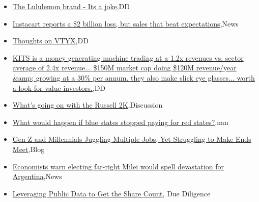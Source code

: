 \documentclass{article}%
\begin{document}
%
\begin{itemize}%
\item%
\href{https://reddit.com/r/wallstreetbets/comments/17rbt3i/the\_lululemon\_brand\_its\_a\_joke/}{The Lululemon brand - Its a joke},DD%
\item%
\href{https://reddit.com/r/wallstreetbets/comments/17r6kcf/instacart\_reports\_a\_2\_billion\_loss\_but\_sales\_that/}{Instacart reports a \$2 billion loss, but sales that beat expectations},News%
\item%
\href{https://reddit.com/r/wallstreetbets/comments/17r6050/thoughts\_on\_vtyx/}{Thoughts on VTYX},DD%
\item%
\href{https://reddit.com/r/Baystreetbets/comments/17qrhf1/kits\_is\_a\_money\_generating\_machine\_trading\_at\_a/}{KITS is a money generating machine trading at a 1.2x revenues vs. sector average of 2.4x revenue... \$150M market cap doing \$120M revenue/year \&amp; growing at a 30\% per annum. they also make slick eye glasses... worth a look for value-investors.},DD%
\item%
\href{https://reddit.com/r/StockMarket/comments/17quhs3/whats\_going\_on\_with\_the\_russell\_2k/}{What's going on with the Russell 2K},Discussion%
\item%
\href{https://reddit.com/r/Economics/comments/17r9qbp/what\_would\_happen\_if\_blue\_states\_stopped\_paying/}{What would happen if blue states stopped paying for red states?},nan%
\item%
\href{https://reddit.com/r/Economics/comments/17r5vdd/gen\_z\_and\_millennials\_juggling\_multiple\_jobs\_yet/}{Gen Z and Millennials Juggling Multiple Jobs, Yet Struggling to Make Ends Meet},Blog%
\item%
\href{https://reddit.com/r/Economics/comments/17qyvmh/economists\_warn\_electing\_farright\_milei\_would/}{Economists warn electing far-right Milei would spell devastation for Argentina},News%
\item%
\href{https://reddit.com/r/Superstonk/comments/17r1i1p/leveraging\_public\_data\_to\_get\_the\_share\_count/}{Leveraging Public Data to Get the Share Count}, Due Diligence%
\end{itemize}%
\end{document}
